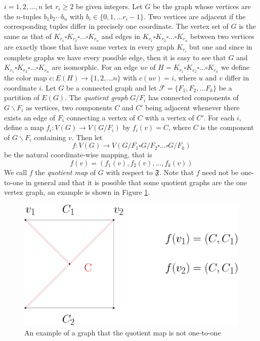 \documentclass[12pt,a4paper,titlepage,openany]{report}
\begin{document}
$i=1,2,\ldots, n$ let $r_i\geq 2$ be given integers. Let $G$ be the graph whose vertices are the $n$-tuples $b_1b_2\cdots b_n$ with $b_i\in \{0,1,\ldots r_i-1\}$. Two vertices are adjacent if the corresponding tuples differ in precisely one coordinate. The vertex set of $G$ is the same as that of $K_{r_1}\square K_{r_2}\square \ldots \square K_{r_n}$ and edges in $K_{r_1}\square K_{r_2}\square \ldots \square K_{r_n}$ between two vertices are exactly those that have same vertex in every graph $K_{r_i}$ but one and since in complete graphs we have every possible edge, then it is easy to see that $G$ and $K_{r_1}\square K_{r_2}\square \ldots \square K_{r_n}$ are isomorphic. For an edge $uv$ of
$H=K_{r_1}\square K_{r_2}\square \ldots \square K_{r_n}$ we define the color map $c:E(H)\rightarrow \{1,2,\ldots n\}$ with $c(uv)=i$, where $u$ and $v$ differ in coordinate $i$.
\newline
Let $G$ be a connected graph and let $\mathcal{F}=\{F_1,F_2,\ldots F_k\}$ be a partition of $E(G)$. The \textit{quotient graph} $G/ F_i$ has connected components of $G\backslash F_i$ as vertices, two components $C$ and $C'$ being adjacent whenever there exists an edge of $F_i$ connecting a vertex of $C$ with a vertex of $C'$. For each $i$, define a map $f_i:V(G)\rightarrow V(G/ F_i)$ by $f_i(v)=C$, where $C$ is the component of $G\backslash F_i$ containing $v$. Then let
$$f:V(G)\to V(G/ F_1\square G/ F_2\square \ldots \square G/ F_k)$$
be the natural coordinate-wise mapping, that is
$$f(v)=(f_1(v),f_2(v),\ldots , f_k(v))$$
We call $f$ the \textit{quotient map} of $G$ with respect to $\mathfrak{F}$. Note that $f$ need not be one-to-one in general and that it is possible that some quotient graphs are the one vertex graph, an example is shown in Figure \ref{fnotonetoone}.
\begin{figure}[h]\label{fnotonetoone}
\begin{center}
\includegraphics[width=1\linewidth]{figures/fnotonetoone.png}
\end{center}
\caption{An example of a graph that the quotient map is not one-to-one}
\end{figure}
\end{document}
